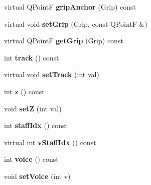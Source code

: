 \begin{DoxyCompactItemize}
\mbox{\label{class_ms_1_1_element_a03fc88ee19e2958f2443213af6d5e77d}} 
virtual Q\+PointF {\bfseries grip\+Anchor} (Grip) const
\item 
\mbox{\label{class_ms_1_1_element_a8e77484bef634bde3996a6a5cd0aafbc}} 
virtual void {\bfseries set\+Grip} (Grip, const Q\+PointF \&)
\item 
\mbox{\label{class_ms_1_1_element_ae486830fb33c13e5a392df2021b1732c}} 
virtual Q\+PointF {\bfseries get\+Grip} (Grip) const
\item 
\mbox{\label{class_ms_1_1_element_ab4986d1b4f0d45b8e84cf52c46885c36}} 
int {\bfseries track} () const
\item 
\mbox{\label{class_ms_1_1_element_a884bf81982c8c302cbdf79ea567c3ced}} 
virtual void {\bfseries set\+Track} (int val)
\item 
\mbox{\label{class_ms_1_1_element_a0e947d90ca39376fd98b995d34811126}} 
int {\bfseries z} () const
\item 
\mbox{\label{class_ms_1_1_element_a1a35bada3f70ea05096258aa18d74b3c}} 
void {\bfseries setZ} (int val)
\item 
\mbox{\label{class_ms_1_1_element_a3c37abb86b5dfb5b16fe74155154bab8}} 
int {\bfseries staff\+Idx} () const
\item 
\mbox{\label{class_ms_1_1_element_ad1e0d3968ecafec4140aac087bd8fd99}} 
virtual int {\bfseries v\+Staff\+Idx} () const
\item 
\mbox{\label{class_ms_1_1_element_a7e7ba0487a1113884ed218ba74c6a7d6}} 
int {\bfseries voice} () const
\item 
\mbox{\label{class_ms_1_1_element_a03037db721d985f097d7ca610f402850}} 
void {\bfseries set\+Voice} (int v)
\item 
\mbox{\label{class_ms_1_1_element_a14581354d9bfc2c39c7dafbed79403da}} 

\end{DoxyCompactItemize}
